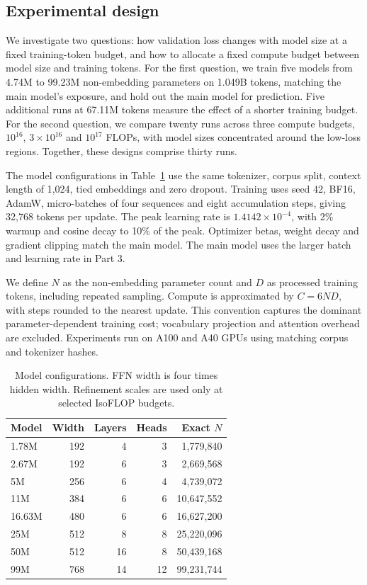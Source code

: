 \documentclass{article}
\begin{document}
\subsection{Experimental design}
We investigate two questions: how validation loss changes with model size at a fixed training-token budget, and how to allocate a fixed compute budget between model size and training tokens. For the first question, we train five models from 4.74M to 99.23M non-embedding parameters on 1.049B tokens, matching the main model's exposure, and hold out the main model for prediction. Five additional runs at 67.11M tokens measure the effect of a shorter training budget. For the second question, we compare twenty runs across three compute budgets, $10^{16}$, $3\times10^{16}$ and $10^{17}$ FLOPs, with model sizes concentrated around the low-loss regions. Together, these designs comprise thirty runs.

The model configurations in Table~\ref{tab:scaling-models} use the same tokenizer, corpus split, context length of 1,024, tied embeddings and zero dropout. Training uses seed 42, BF16, AdamW, micro-batches of four sequences and eight accumulation steps, giving 32,768 tokens per update. The peak learning rate is $1.4142\times10^{-4}$, with 2\% warmup and cosine decay to 10\% of the peak. Optimizer betas, weight decay and gradient clipping match the main model. The main model uses the larger batch and learning rate in Part 3.

We define $N$ as the non-embedding parameter count and $D$ as processed training tokens, including repeated sampling. Compute is approximated by $C=6ND$, with steps rounded to the nearest update. This convention captures the dominant parameter-dependent training cost; vocabulary projection and attention overhead are excluded. Experiments run on A100 and A40 GPUs using matching corpus and tokenizer hashes.

\begin{table}[H]
\setlength{\abovecaptionskip}{7pt}\setlength{\belowcaptionskip}{7pt}
\centering\small
\begin{tabular}{lrrrr}\toprule Model & Width & Layers & Heads & Exact $N$\\\midrule
1.78M&192&4&3&1,779,840\\2.67M&192&6&3&2,669,568\\5M&256&6&4&4,739,072\\11M&384&6&6&10,647,552\\16.63M&480&6&6&16,627,200\\25M&512&8&8&25,220,096\\50M&512&16&8&50,439,168\\99M&768&14&12&99,231,744\\\bottomrule
\end{tabular}\caption{Model configurations. FFN width is four times hidden width. Refinement scales are used only at selected IsoFLOP budgets.}\label{tab:scaling-models}\end{table}
\end{document}
